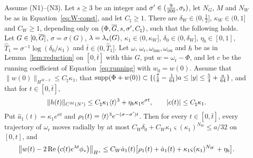 \begin{lemma}
\label{lem:window}
Assume \textup{(N1)}--\textup{(N3)}. Let $s\ge3$ be an integer and
$\sigma'\in(\frac9{200},\sigma_\flat)$, let $N_G$, $M$ and $N_W$ be as in
Equation~\eqref{eq:W-const}, and let $C_\natural\ge1$. There are $\delta_W\in(0,\frac12]$, $\kappa_W\in(0,1]$ and
$C_W\ge1$, depending only on $(\Phi,\overline{G},s,\sigma',C_\natural)$, such that the
following holds. Let $G\in[0,\overline{G}]$, $\sigma=\sigma(G)$, $\lambda=\lambda_*(G)$,
$\kappa_1\in(0,\kappa_W]$, $\delta_0\in(0,\delta_W]$, $\eta_b\in[0,1]$,
$\hat T_1=\sigma^{-1}\log(\delta_0/\kappa_1)$ and $\bar t\in(0,\hat T_1]$. Let
$\omega$, $\omega_{\mathrm r},\omega_{\mathrm{inn}},\omega_{\mathrm{ou}}$ and $h$ be as in
Lemma~\ref{lem:reduction} on $[0,\bar t]$ with this $G$, put
$w=\omega_{\mathrm r}-\Phi$, and let $c$ be the running coefficient of Equation~\eqref{eq:running}
with $w_0=w(0)$. Assume that $\|w(0)\|_{H^{M-2}}\le C_\natural\kappa_1$, that
$\operatorname{supp}(\Phi+w(0))\subset\{(\frac78-\frac1{64})a\le|y|\le\frac54+\frac a{64}\}$, and
that for $t\in[0,\bar t]$,
\[
\|h(t)\|_{C^M(N')}\le C_\natural\kappa_1\langle t\rangle^3+\eta_b\kappa_1e^{\sigma t},\qquad
|c(t)|\le C_\natural\kappa_1 .
\]
Put $\hat a_1(t)=\kappa_1e^{\sigma t}$ and $\rho_1(t)=\langle t\rangle^3e^{-(\sigma-\sigma')t}$.
Then for every $t\in[0,\bar t]$, every trajectory of $\omega_{\mathrm r}$ moves
radially by at most $C_W\delta_0+C_W\kappa_1\varsigma(\kappa_1)^{N_W}\le a/32$ on
$[0,t]$, and
\[
\big\|w(t)-2\Re\big(c(t)e^{\lambda t}\phi_*\big)\big\|_{H^s}\le C_W\hat a_1(t)\big[\rho_1(t)+\hat a_1(t)+\kappa_1\varsigma(\kappa_1)^{N_W}+\eta_b\big].
\]
\end{lemma}
